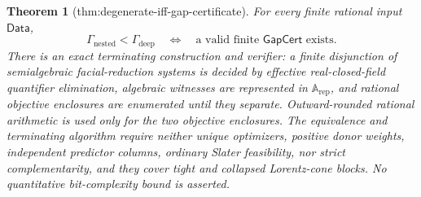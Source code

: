 \documentclass{article}
\newtheorem{theorem}{Theorem}
\begin{document}
\begin{theorem}[thm:degenerate-iff-gap-certificate]\label{thm:degenerate-iff-gap-certificate}
For every finite rational input \(\mathsf{Data}\),
\[
 \Gamma_{\mathrm{nested}}<\Gamma_{\mathrm{deep}}
 \quad\Longleftrightarrow\quad
 \text{a valid finite }\mathsf{GapCert}\text{ exists}.
\]
There is an exact terminating construction and verifier: a finite disjunction of semialgebraic facial-reduction systems is decided by effective real-closed-field quantifier elimination, algebraic witnesses are represented in \(\mathbb A_{\mathrm{rep}}\), and rational objective enclosures are enumerated until they separate.  Outward-rounded rational arithmetic is used only for the two objective enclosures.  The equivalence and terminating algorithm require neither unique optimizers, positive donor weights, independent predictor columns, ordinary Slater feasibility, nor strict complementarity, and they cover tight and collapsed Lorentz-cone blocks.  No quantitative bit-complexity bound is asserted.
\end{theorem}
\end{document}
